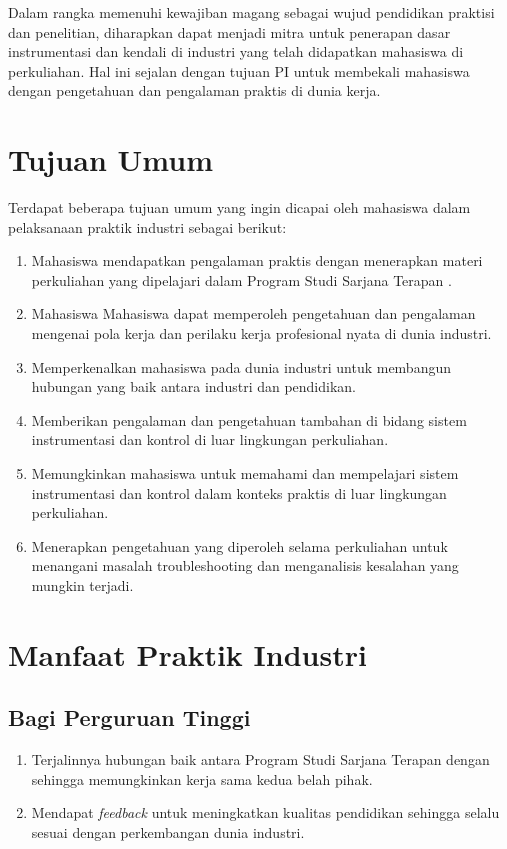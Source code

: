 Dalam rangka memenuhi kewajiban magang sebagai wujud pendidikan praktisi dan penelitian, {\perusahaan} diharapkan dapat menjadi mitra untuk penerapan dasar instrumentasi dan kendali di industri yang telah didapatkan mahasiswa di perkuliahan. Hal ini sejalan dengan tujuan PI untuk membekali mahasiswa dengan pengetahuan dan pengalaman praktis di dunia kerja.

\section{Tujuan Umum}

Terdapat beberapa tujuan umum yang ingin dicapai oleh mahasiswa dalam pelaksanaan praktik industri sebagai berikut:

\begin{enumerate}
    \item Mahasiswa mendapatkan pengalaman praktis dengan menerapkan materi perkuliahan yang dipelajari dalam Program Studi Sarjana Terapan {\prodi}.
    \item Mahasiswa Mahasiswa dapat memperoleh pengetahuan dan pengalaman mengenai pola kerja dan perilaku kerja profesional nyata di dunia industri.
    \item Memperkenalkan mahasiswa pada dunia industri untuk membangun hubungan yang baik antara industri dan pendidikan.
    \item Memberikan pengalaman dan pengetahuan tambahan di bidang sistem instrumentasi dan kontrol di luar lingkungan perkuliahan.
    \item Memungkinkan mahasiswa untuk memahami dan mempelajari sistem instrumentasi dan kontrol dalam konteks praktis di luar lingkungan perkuliahan.
    \item Menerapkan pengetahuan yang diperoleh selama perkuliahan untuk menangani masalah troubleshooting dan menganalisis kesalahan yang mungkin terjadi.
\end{enumerate}

\section{Manfaat Praktik Industri}

\subsection{Bagi Perguruan Tinggi}

\begin{enumerate}
    \item Terjalinnya hubungan baik antara Program Studi Sarjana Terapan {\prodi} {\universitas} dengan {\perusahaan} sehingga memungkinkan kerja sama kedua belah pihak.
    \item Mendapat \textit{feedback} untuk meningkatkan kualitas pendidikan sehingga selalu sesuai dengan perkembangan dunia industri. 
\end{enumerate}

